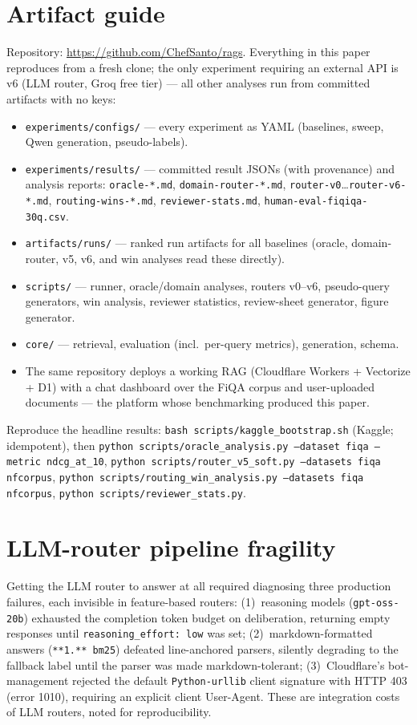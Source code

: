 \documentclass[11pt]{article}
\begin{document}
\appendix
\section{Artifact guide}
Repository: \url{https://github.com/ChefSanto/rags}. Everything in this paper reproduces from a fresh clone; the only experiment requiring an external API is v6 (LLM router, Groq free tier) --- all other analyses run from committed artifacts with no keys:
\begin{itemize}
\item \texttt{experiments/configs/} --- every experiment as YAML (baselines, sweep, Qwen generation, pseudo-labels).
\item \texttt{experiments/results/} --- committed result JSONs (with provenance) and analysis reports: \texttt{oracle-*.md}, \texttt{domain-router-*.md}, \texttt{router-v0}\dots\texttt{router-v6-*.md}, \texttt{routing-wins-*.md}, \texttt{reviewer-stats.md}, \texttt{human-eval-fiqiqa-30q.csv}.
\item \texttt{artifacts/runs/} --- ranked run artifacts for all baselines (oracle, domain-router, v5, v6, and win analyses read these directly).
\item \texttt{scripts/} --- runner, oracle/domain analyses, routers v0--v6, pseudo-query generators, win analysis, reviewer statistics, review-sheet generator, figure generator.
\item \texttt{core/} --- retrieval, evaluation (incl.\ per-query metrics), generation, schema.
\item The same repository deploys a working RAG (Cloudflare Workers + Vectorize + D1) with a chat dashboard over the FiQA corpus and user-uploaded documents --- the platform whose benchmarking produced this paper.
\end{itemize}
Reproduce the headline results: \texttt{bash scripts/kaggle\_bootstrap.sh} (Kaggle; idempotent), then \texttt{python scripts/oracle\_analysis.py --dataset fiqa --metric ndcg\_at\_10}, \texttt{python scripts/router\_v5\_soft.py --datasets fiqa nfcorpus}, \texttt{python scripts/routing\_win\_analysis.py --datasets fiqa nfcorpus}, \texttt{python scripts/reviewer\_stats.py}.

\section{LLM-router pipeline fragility}\label{app:fragility}
Getting the LLM router to answer at all required diagnosing three production failures, each invisible in feature-based routers: (1)~reasoning models (\texttt{gpt-oss-20b}) exhausted the completion token budget on deliberation, returning empty responses until \texttt{reasoning\_effort: low} was set; (2)~markdown-formatted answers (\texttt{**1.** bm25}) defeated line-anchored parsers, silently degrading to the fallback label until the parser was made markdown-tolerant; (3)~Cloudflare's bot-management rejected the default \texttt{Python-urllib} client signature with HTTP 403 (error 1010), requiring an explicit client User-Agent. These are integration costs of LLM routers, noted for reproducibility.
\end{document}
